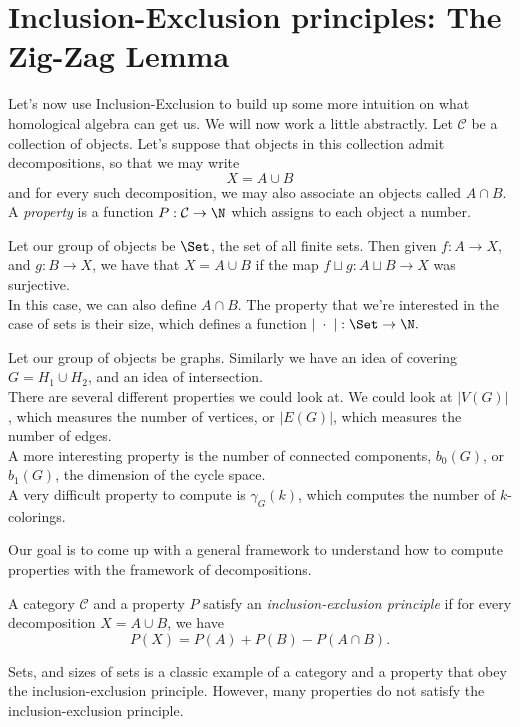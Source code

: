 \section{Inclusion-Exclusion principles: The Zig-Zag Lemma} 
\label{append:inexzigzag}
Let's now use Inclusion-Exclusion to build up some more intuition on what homological algebra can get us. We will now work a little abstractly.
Let $\mathcal C$ be a collection of objects. Let's suppose that objects in this collection admit decompositions, so that we may write 
\[X=A\cup B\]
and for every such decomposition, we may also associate an objects called $A\cap B$. \\
A \emph{property} is a function $P: \mathcal C\to \N$ which assigns to each object a number. 
\begin{example}
Let our group of objects be $\Set$, the set of all finite sets. Then given $f: A\to X$, and $g: B\to X$, we have that $X=A\cup B$ if the map $f\sqcup g: A\sqcup B \to X$ was surjective. \\
In this case, we can also define $A\cap B$. The property that we're interested in the case of sets is their size, which defines a function $|\;\cdot \;|: \Set \to \N.$
\end{example}
\begin{example}
Let our group of objects be graphs. Similarly we have an idea of covering $G=H_1\cup H_2$, and an idea of intersection.\\
There are several different properties we could look at. We could look at $|V(G)|$, which measures the number of vertices, or $|E(G)|$, which measures the number of edges. \\
A more interesting property is the number of connected components, $b_0(G)$, or $b_1(G)$, the dimension of the cycle space.\\
A very difficult property to compute is $\gamma_G(k)$, which computes the number of $k$-colorings. 
\end{example}
Our goal is to come up with a general framework to understand how to compute properties with the framework of decompositions. 
\begin{definition}
A category $\mathcal C$ and a property $P$ satisfy an \emph{inclusion-exclusion principle} if for every decomposition $X=A\cup B$, we have 
\[P(X)=P(A)+P(B)-P(A\cap B).\]
\end{definition}
Sets, and sizes of sets is a classic example of a category and a property that obey the inclusion-exclusion principle. However, many properties do not satisfy the inclusion-exclusion principle. 
